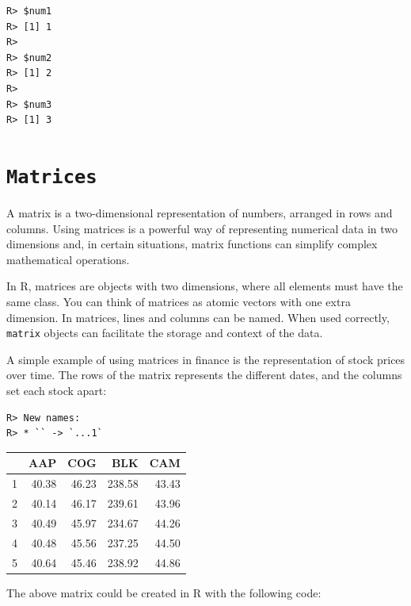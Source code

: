 \documentclass[
  12pt,
]{book}
\begin{document}
\begin{verbatim}
R> $num1
R> [1] 1
R> 
R> $num2
R> [1] 2
R> 
R> $num3
R> [1] 3
\end{verbatim}

\hypertarget{matrices}{%
\section{\texorpdfstring{\texttt{Matrices}}{Matrices}}\label{matrices}}

A matrix is a two-dimensional representation of numbers, arranged in rows and columns. Using matrices is a powerful way of representing numerical data in two dimensions and, in certain situations, matrix functions can simplify complex mathematical operations.  

In R, matrices are objects with two dimensions, where all elements must have the same class. You can think of matrices as atomic vectors with one extra dimension. In matrices, lines and columns can be named. When used correctly, \texttt{matrix} objects can facilitate the storage and context of the data. 

A simple example of using matrices in finance is the representation of stock prices over time. The rows of the matrix represents the different dates, and the columns set each stock apart:

\begin{verbatim}
R> New names:
R> * `` -> `...1`
\end{verbatim}

\begin{longtable}[]{@{}lrrrr@{}}
\toprule()
& AAP & COG & BLK & CAM \\
\midrule()
\endhead
1 & 40.38 & 46.23 & 238.58 & 43.43 \\
2 & 40.14 & 46.17 & 239.61 & 43.96 \\
3 & 40.49 & 45.97 & 234.67 & 44.26 \\
4 & 40.48 & 45.56 & 237.25 & 44.50 \\
5 & 40.64 & 45.46 & 238.92 & 44.86 \\
\bottomrule()
\end{longtable}

The above matrix could be created in R with the following code:
\end{document}
